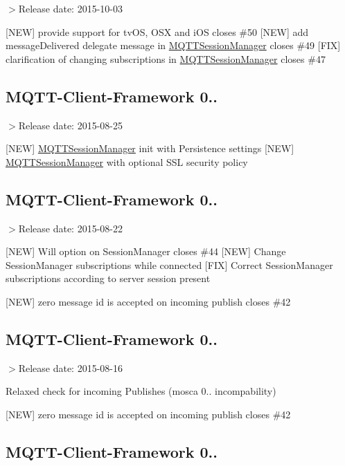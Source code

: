 $>$Release date\+: 2015-\/10-\/03

\mbox{[}N\+EW\mbox{]} provide support for tv\+OS, O\+SX and i\+OS closes \#50 \mbox{[}N\+EW\mbox{]} add message\+Delivered delegate message in \hyperlink{interface_m_q_t_t_session_manager}{M\+Q\+T\+T\+Session\+Manager} closes \#49 \mbox{[}F\+IX\mbox{]} clarification of changing subscriptions in \hyperlink{interface_m_q_t_t_session_manager}{M\+Q\+T\+T\+Session\+Manager} closes \#47

\subsection*{M\+Q\+T\+T-\/\+Client-\/\+Framework 0..}

$>$Release date\+: 2015-\/08-\/25

\mbox{[}N\+EW\mbox{]} \hyperlink{interface_m_q_t_t_session_manager}{M\+Q\+T\+T\+Session\+Manager} init with Persistence settings \mbox{[}N\+EW\mbox{]} \hyperlink{interface_m_q_t_t_session_manager}{M\+Q\+T\+T\+Session\+Manager} with optional S\+SL security policy

\subsection*{M\+Q\+T\+T-\/\+Client-\/\+Framework 0..}

$>$Release date\+: 2015-\/08-\/22

\mbox{[}N\+EW\mbox{]} Will option on Session\+Manager closes \#44 \mbox{[}N\+EW\mbox{]} Change Session\+Manager subscriptions while connected \mbox{[}F\+IX\mbox{]} Correct Session\+Manager subscriptions according to server session present

\mbox{[}N\+EW\mbox{]} zero message id is accepted on incoming publish closes \#42

\subsection*{M\+Q\+T\+T-\/\+Client-\/\+Framework 0..}

$>$Release date\+: 2015-\/08-\/16

Relaxed check for incoming Publishes (mosca 0.. incompability)

\mbox{[}N\+EW\mbox{]} zero message id is accepted on incoming publish closes \#42

\subsection*{M\+Q\+T\+T-\/\+Client-\/\+Framework 0..}

